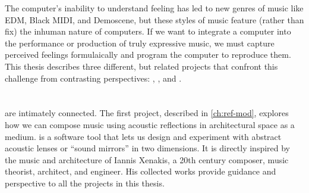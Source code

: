 The computer's inability to understand feeling has led to new genres
of music like EDM, Black
MIDI, and Demoscene, but these styles of music
feature (rather than fix) the inhuman nature of computers. If we want
to integrate a computer into the performance or production of truly
expressive music, we must capture perceived feelings formulaically
and program the computer to reproduce them. This thesis describes
three different, but related projects that confront this challenge from
contrasting perspectives: , \polytempic, and \thesis.

\section{}
\label{sec:refmod-intro}
 are intimately connected. The first
project, described in \autoref{ch:ref-mod}, explores how we can
compose music using acoustic reflections in architectural space as a
medium.  is a software tool that lets us design and experiment
with abstract acoustic lenses or ``sound mirrors'' in two
dimensions. It is directly inspired by the music and architecture of
Iannis Xenakis, a 20th century composer, music theorist, architect,
and engineer. His collected works provide guidance and perspective to
all the projects in this thesis.

\section{\polytempic}
\label{sec:polytempic-intro}

